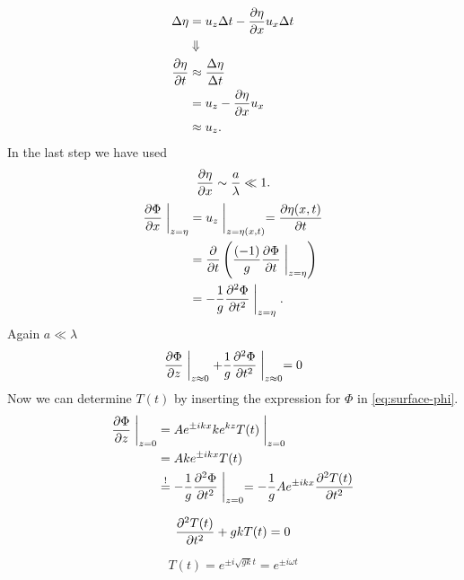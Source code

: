 \begin{align}
\Delta \eta &= u_z\Delta t-\frac{\partial \eta}{\partial x}u_x\Delta t\\
&\Downarrow\notag\\
\frac{\partial \eta}{\partial t}&\approx\frac{\Delta \eta}{\Delta t}\\
&= u_z-\frac{\partial \eta}{\partial x}u_x\\
&\approx u_z.
\end{align}
In the last step we have used
\begin{equation}
\frac{\partial \eta}{\partial x}\sim\frac{a}{\lambda}\ll1.
\end{equation}
\begin{align}
\frac{\partial \Phi}{\partial x}\biggm\vert_{z=\eta} &= u_z\biggm\vert_{z=\eta(x,t)} = \frac{\partial \eta(x,t)}{\partial t} \\
&= \frac{\partial }{\partial t}\left(\frac{(-1)}{g}\frac{\partial \Phi}{\partial t}\biggm\vert_{z=\eta}\right) \\
&= -\frac{1}{g}\frac{\partial^2 \Phi}{\partial t^2}\biggm\vert_{z=\eta}.
\end{align}
Again $a\ll \lambda$
\begin{equation}
\frac{\partial \Phi}{\partial z}\biggm\vert_{z\approx0} + \frac{1}{g}\frac{\partial^2 \Phi}{\partial t^2}\biggm\vert_{z\approx0}=0
\end{equation}
Now we can determine $T(t)$ by inserting the expression for $\Phi$ in \eqref{eq:surface-phi}.
\begin{align}
\frac{\partial \Phi}{\partial z}\biggm\vert_{z=0} &= Ae^{\pm ikx}ke^{kz}T(t)\biggm\vert_{z=0}\\
&= Ake^{\pm ikx} T(t)\\
&\overset{!}{=} -\frac{1}{g} \frac{\partial^2 \Phi}{\partial t^2}\biggm\vert_{z=0} = -\frac{1}{g}Ae^{\pm ikx}\frac{\partial^2 T(t)}{\partial t^2}
\end{align}

\begin{equation}
\frac{\partial^2 T(t)}{\partial t^2}+gkT(t)=0
\end{equation}

\begin{equation}
T(t)=e^{\pm i\sqrt{gk}t} = e^{\pm i\omega t}
\end{equation}

